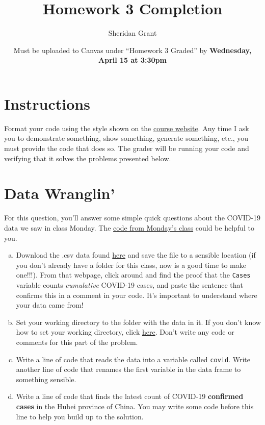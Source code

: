\documentclass[12pt]{article}
\title{Homework 3 Completion}
\author{Sheridan Grant}
\date{Must be uploaded to Canvas under ``Homework 3 Graded'' by \textbf{Wednesday, April 15 at 3:30pm}}
\begin{document}
\sloppy

\maketitle

\section*{Instructions}

Format your code using the style shown on the \href{https://sheridanlgrant.github.io/teaching/STAT302_SPR2020}{course website}. Any time I ask you to demonstrate something, show something, generate something, etc., you must provide the code that does so. The grader will be running your code and verifying that it solves the problems presented below.

\section{Data Wranglin'}

For this question, you'll answer some simple quick questions about the COVID-19 data we saw in class Monday. The \href{https://sheridanlgrant.github.io/teaching/STAT302_SPR2020/week3/lecture5_grant.R}{code from Monday's class} could be helpful to you.

\begin{enumerate}[(a)]
	\item Download the .csv data found \href{https://data.world/covid-19-data-resource-hub/covid-19-case-counts/workspace/file?filename=COVID-19+Cases.csv}{here} and save the file to a sensible location (if you don't already have a folder for this class, now is a good time to make one!!!). From that webpage, click around and find the proof that the \verb|Cases| variable counts \textit{cumulative} COVID-19 cases, and paste the sentence that confirms this in a comment in your code. It's important to understand where your data came from!
	\item Set your working directory to the folder with the data in it. If you don't know how to set your working directory, click \href{https://lmgtfy.com/?q=how+to+set+working+directory+in+r}{here}. Don't write any code or comments for this part of the problem.
	\item Write a line of code that reads the data into a variable called \verb|covid|. Write another line of code that renames the first variable in the data frame to something sensible.
	\item Write a line of code that finds the latest count of COVID-19 \textbf{confirmed cases} in the Hubei province of China. You may write some code before this line to help you build up to the solution.
\end{enumerate}
\end{document}
